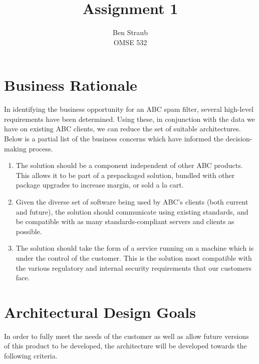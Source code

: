 \documentclass[11pt,letterpaper]{article}
\begin{document}
\author{Ben Straub\\OMSE 532}
\title{Assignment 1}
\maketitle


\section{Business Rationale}

In identifying the business opportunity for an ABC spam filter, several
high-level requirements have been determined.  Using these, in conjunction
with the data we have on existing ABC clients, we can reduce the set of
suitable architectures.  Below is a partial list of the business concerns
which have informed the decision-making process.

\begin{enumerate}
\item The solution should be a component independent of other ABC products.
  This allows it to be part of a prepackaged solution, bundled with other
  package upgrades to increase margin, or sold a la cart.
\item Given the diverse set of software being used by ABC's clients (both
  current and future), the solution should communicate using existing
  standards, and be compatible with as many standards-compliant servers and
  clients as possible.
\item The solution should take the form of a service running on a machine
  which is under the control of the customer.  This is the solution most
  compatible with the various regulatory and internal security requirements
  that our customers face.
\end{enumerate}


\section{Architectural Design Goals}

In order to fully meet the needs of the customer as well as allow future
versions of this product to be developed, the architecture will be developed
towards the following criteria.
\end{document}
